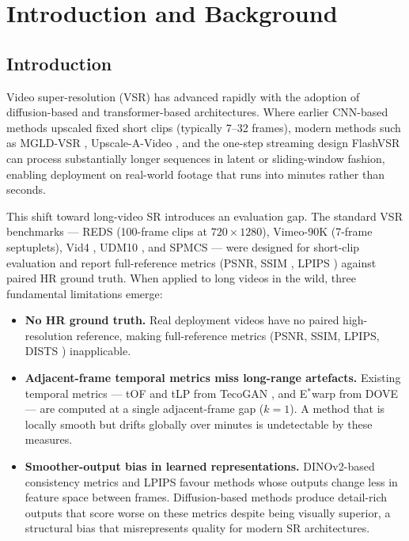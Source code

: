\chapter{Introduction and Background}
\label{ch:intro}

\section{Introduction}
\label{sec:intro:background}

Video super-resolution (VSR) has advanced rapidly with the adoption of diffusion-based and
transformer-based architectures. Where earlier CNN-based methods upscaled fixed short clips
(typically 7--32 frames), modern methods such as MGLD-VSR \cite{he_mgld_2024},
Upscale-A-Video \cite{zhou_upscale_2024}, and the one-step streaming design FlashVSR
\cite{zhuang_flashvsr_2025} can process substantially longer sequences in latent or
sliding-window fashion, enabling deployment on real-world footage that runs into minutes
rather than seconds.

This shift toward long-video SR introduces an evaluation gap. The standard VSR benchmarks
--- REDS \cite{nah_reds_2019} (100-frame clips at $720\!\times\!1280$), Vimeo-90K
\cite{xue_vimeo90k_2019} (7-frame septuplets), Vid4 \cite{liu_vid4_2014}, UDM10
\cite{yi_pfnl_2019}, and SPMCS \cite{tao_spmcs_2017} --- were designed for short-clip
evaluation and report full-reference metrics (PSNR, SSIM \cite{wang_ssim_2004}, LPIPS
\cite{zhang_lpips_2018}) against paired HR ground truth. When applied to long videos in
the wild, three fundamental limitations emerge:

\begin{itemize}
    \item \textbf{No HR ground truth.} Real deployment videos have no paired high-resolution
          reference, making full-reference metrics (PSNR, SSIM, LPIPS, DISTS
          \cite{ding_dists_2020}) inapplicable.
    \item \textbf{Adjacent-frame temporal metrics miss long-range artefacts.} Existing
          temporal metrics --- tOF and tLP from TecoGAN \cite{chu_tecogan_2020}, and
          E$^*$warp from DOVE \cite{yang_dove_2024} --- are computed at a single
          adjacent-frame gap ($k{=}1$). A method that is locally smooth but drifts globally
          over minutes is undetectable by these measures.
    \item \textbf{Smoother-output bias in learned representations.} DINOv2-based
          \cite{oquab_dinov2_2023} consistency metrics and LPIPS favour methods whose
          outputs change less in feature space between frames. Diffusion-based methods
          produce detail-rich outputs that score worse on these metrics despite being
          visually superior, a structural bias that misrepresents quality for modern SR
          architectures.
\end{itemize}

